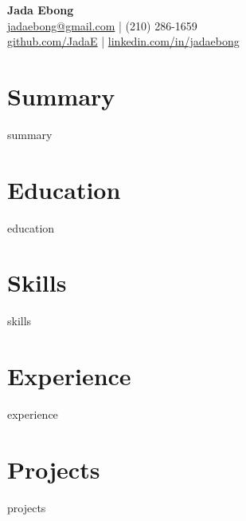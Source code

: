 \documentclass[10pt]{article}
\begin{document}
\begin{center}
  \textbf{\Large Jada Ebong} \\[0.2em]
  \href{mailto:jadaebong@gmail.com}{jadaebong@gmail.com} \quad | \quad (210) 286-1659 \\[0.2em]
  \href{https://github.com/JadaE}{github.com/JadaE} \quad | \quad \href{https://linkedin.com/in/jadaebong}{linkedin.com/in/jadaebong}
\end{center}

\section{Summary}
{{ summary }}

\section*{Education}
{{ education }}

\section*{Skills}
{{ skills }}

\section*{Experience}
{{ experience }}

\section*{Projects}
{{ projects }}
\end{document}
